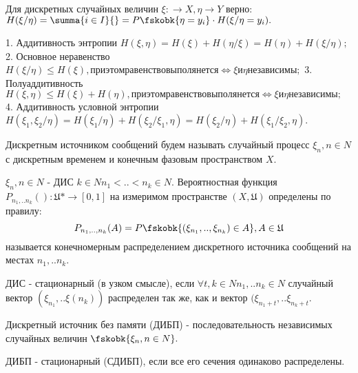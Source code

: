 \begin{proofs}
Для дискретных случайных величин $\xi: \to X,  \eta \to Y $ верно:
$H(\xi / \eta) = \summa{i\in I}{} = P \fskobk{\eta=y_i} \cdot H(\xi/\eta = y_i).$
\end{proofs}  

\begin{proofs}
1. Аддитивность энтропии $H(\xi, \eta) = H(\xi) + H(\eta/\xi) = H(\eta) + H(\xi / \eta);$
2. Основное неравенство $H(\xi / \eta) \leq H(\xi), при этом равенство выполянется \Leftrightarrow \xi и \eta независимы;$
3. Полуаддитивность $H(\xi, \eta) \leq H(\xi) + H(\eta), при этом равенство выполянется \Leftrightarrow \xi и \eta независимы;$
4. Аддитивность условной энтропии $H(\xi_1, \xi_2 / \eta) = H(\xi_1 / \eta) + H(\xi_2 / \xi_1, \eta) = H(\xi_2 / \eta) + H(\xi_1 / \xi_2, \eta).$
\end{proofs}

\begin{defs}
Дискретным источником сообщений будем называть случайный процесс $ {\xi_n, n \in N}$ с дискретным временем и конечным фазовым пространством $X$.
\end{defs}

\begin{defs}
 ${\xi_n, n \in N}$ - ДИС $k \in N n_1<..<n_k \in N.$ Вероятностная функция $P_{n_1,..n_k}():\mathfrak{U}* \to [0,1]$ на измеримом пространстве $(X, \mathfrak{U})$ определены по правилу:
$$P_{n_1,..,n_k}(A)=P \fskobk{(\xi_{n_1},..,\xi_{n_k})\in A}, A \in \mathfrak{U}$$ 
называется конечномерным распределением дискретного источника сообщений на местах $n_1,..n_k.$
\end{defs}

\begin{defs}
ДИС - стационарный (в узком смысле), если $\forall t,k \in N n_1,..n_k \in N$ случайный вектор $(\xi_{n_1},..\xi(n_k))$ распределен так же, как и вектор $(\xi_{n_1 + t},..\xi_{n_k + t}.$
\end{defs}

\begin{defs}
Дискретный источник без памяти (ДИБП) - последовательность независимых случайных величин  $\fskobk{\xi_n, n \in N}.$
\end{defs}

\begin{defs}
ДИБП - стационарный (СДИБП), если все его сечения одинаково распределены.
\end{defs}

